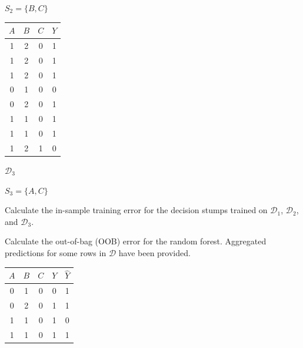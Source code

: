 \documentclass[11pt,addpoints,answers]{exam}
\begin{document}
\begin{questions}
\begin{parts}
\begin{table}[h]
{    $S_2 = \{B, C\}$}
    \parbox{.3\linewidth}{
    \center
    \begin{tabular}{|c|c|c|c|}
    \hline
    $A$ & $B$ & $C$ & $Y$ \\ \hline
    1 & 2 & 0 & 1     \\ \hline
    1 & 2 & 0 & 1     \\ \hline
    1 & 2 & 0 & 1     \\ \hline
    0 & 1 & 0 & 0     \\ \hline
    0 & 2 & 0 & 1     \\ \hline
    1 & 1 & 0 & 1     \\ \hline
    1 & 1 & 0 & 1     \\ \hline
    1 & 2 & 1 & 0     \\ \hline
    \end{tabular}
    \vspace{1em}
    
    $\mathcal{D}_3$
    
    $S_3 = \{A, C\}$}
\end{table}

\begin{subparts}

\subpart[3] Calculate the in-sample training error for the decision stumps trained on $\mathcal{D}_1$, $\mathcal{D}_2$, and $\mathcal{D}_3$. 

\begin{your_solution}[title=Error on $\mathcal{D}_1$,height=2cm,width=4cm]
\end{your_solution}
\begin{your_solution}[title=Error on $\mathcal{D}_2$,height=2cm,width=4cm]
\end{your_solution}
\begin{your_solution}[title=Error on $\mathcal{D}_3$,height=2cm,width=4cm]
\end{your_solution}


\subpart[2] Calculate the out-of-bag (OOB) error for the random forest. Aggregated predictions for some rows in $\mathcal{D}$ have been provided. 

\begin{center}
\renewcommand{\arraystretch}{1.25}
\begin{tabular}{|c|c|c|c|c|}
\hline
$A$ & $B$ & $C$ & $Y$ & $\hat{Y}$\\ \hline
0 & 1 & 0 & 0 & 1   \\ \hline
0 & 2 & 0 & 1 & 1   \\ \hline
1 & 1 & 0 & 1 & 0   \\ \hline
1 & 1 & 0 & 1 & 1   \\ \hline
\end{tabular}
\end{center}


\end{subparts}
\end{parts}
\end{questions}
\end{document}
